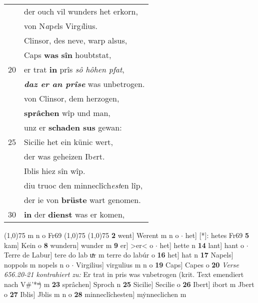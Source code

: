 \documentclass[8pt,a4paper,notitlepage]{article}
\begin{document}
\begin{table}[ht]
\begin{minipage}[t]{0.5\linewidth}
\begin{tabular}{rl}
 & der ouch vil wunders het erkorn,\\ 
 & von N\textit{a}p\textit{e}ls Virg\textit{i}lius.\\ 
 & Clinsor, des neve, warp alsus,\\ 
 & Caps \textbf{was} \textbf{sîn} houbtstat,\\ 
20 & er trat \textbf{in} prîs \textit{sô hôhen pfat},\\ 
 & \textit{\textbf{daz er an prîse}} was unbetrogen.\\ 
 & von Clinsor, dem herzogen,\\ 
 & \textbf{sprâchen} wîp und man,\\ 
 & unz er \textbf{schaden sus} gewan:\\ 
25 & Sicilie het ein künic wert,\\ 
 & der was geheizen Ib\textit{e}rt.\\ 
 & Iblis hiez sîn wîp.\\ 
 & diu truoc den minneclîch\textit{est}en lîp,\\ 
 & der ie von \textbf{brüste} wart genomen.\\ 
30 & \textbf{in} der \textbf{dienst} was er komen,\\ 
\end{tabular}
\scriptsize
\line(1,0){75} \newline
m n o Fr69 \newline
\line(1,0){75} \newline
\newline
\line(1,0){75} \newline
\textbf{2} went] Werent m n o  $\cdot$ het] [*]: hetes Fr69 \textbf{5} kam] Kein o \textbf{8} wundern] wunder m \textbf{9} er] >er< o  $\cdot$ het] hette n \textbf{14} lant] hant o  $\cdot$ Terre de Labur] tere do lab uͯr m terre do labúr o \textbf{16} het] hat n \textbf{17} Napels] noppols m nopels n o  $\cdot$ Virgilius] virgulius m n o \textbf{19} Caps] Capes o \textbf{20} \textit{Verse 656.20-21 kontrahiert zu:} Er trat in pris was vnbetrogen (krit. Text emendiert nach V#'* ͫ) m  \textbf{23} sprâchen] Sproch n \textbf{25} Sicilie] Secilie o \textbf{26} Ibert] ibort m Jbert o \textbf{27} Iblis] Jblis m n o \textbf{28} minneclîchesten] mẏnneclichen m \newline
\end{minipage}
\end{table}
\newpage
\end{document}
